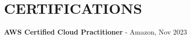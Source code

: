 \documentclass[a4paper,11pt]{article}
\begin{document}
\section{CERTIFICATIONS}
\begin{itemize}[leftmargin=0in, label={}, itemsep=0pt, parsep=0pt, topsep=0pt, partopsep=0pt]
  \small{\item{
    \textbf{AWS Certified Cloud Practitioner} - Amazon, Nov 2023
  }}
\end{itemize}

\end{document}
